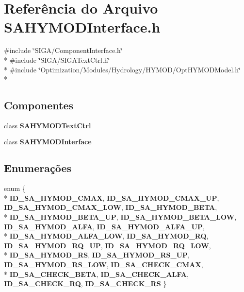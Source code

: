 \section{Referência do Arquivo S\+A\+H\+Y\+M\+O\+D\+Interface.\+h}
\label{_s_a_h_y_m_o_d_interface_8h}
{\ttfamily \#include \char`\"{}S\+I\+G\+A/\+Component\+Interface.\+h\char`\"{}}\\*
{\ttfamily \#include \char`\"{}S\+I\+G\+A/\+S\+I\+G\+A\+Text\+Ctrl.\+h\char`\"{}}\\*
{\ttfamily \#include \char`\"{}Optimization/\+Modules/\+Hydrology/\+H\+Y\+M\+O\+D/\+Opt\+H\+Y\+M\+O\+D\+Model.\+h\char`\"{}}\\*
\subsection*{Componentes}
\begin{DoxyCompactItemize}
\item 
class {\bf S\+A\+H\+Y\+M\+O\+D\+Text\+Ctrl}
\item 
class {\bf S\+A\+H\+Y\+M\+O\+D\+Interface}
\end{DoxyCompactItemize}
\subsection*{Enumerações}
\begin{DoxyCompactItemize}
\item 
enum \{ \\*
{\bf I\+D\+\_\+\+S\+A\+\_\+\+H\+Y\+M\+O\+D\+\_\+\+C\+M\+AX}, 
{\bf I\+D\+\_\+\+S\+A\+\_\+\+H\+Y\+M\+O\+D\+\_\+\+C\+M\+A\+X\+\_\+\+UP}, 
{\bf I\+D\+\_\+\+S\+A\+\_\+\+H\+Y\+M\+O\+D\+\_\+\+C\+M\+A\+X\+\_\+\+L\+OW}, 
{\bf I\+D\+\_\+\+S\+A\+\_\+\+H\+Y\+M\+O\+D\+\_\+\+B\+E\+TA}, 
\\*
{\bf I\+D\+\_\+\+S\+A\+\_\+\+H\+Y\+M\+O\+D\+\_\+\+B\+E\+T\+A\+\_\+\+UP}, 
{\bf I\+D\+\_\+\+S\+A\+\_\+\+H\+Y\+M\+O\+D\+\_\+\+B\+E\+T\+A\+\_\+\+L\+OW}, 
{\bf I\+D\+\_\+\+S\+A\+\_\+\+H\+Y\+M\+O\+D\+\_\+\+A\+L\+FA}, 
{\bf I\+D\+\_\+\+S\+A\+\_\+\+H\+Y\+M\+O\+D\+\_\+\+A\+L\+F\+A\+\_\+\+UP}, 
\\*
{\bf I\+D\+\_\+\+S\+A\+\_\+\+H\+Y\+M\+O\+D\+\_\+\+A\+L\+F\+A\+\_\+\+L\+OW}, 
{\bf I\+D\+\_\+\+S\+A\+\_\+\+H\+Y\+M\+O\+D\+\_\+\+RQ}, 
{\bf I\+D\+\_\+\+S\+A\+\_\+\+H\+Y\+M\+O\+D\+\_\+\+R\+Q\+\_\+\+UP}, 
{\bf I\+D\+\_\+\+S\+A\+\_\+\+H\+Y\+M\+O\+D\+\_\+\+R\+Q\+\_\+\+L\+OW}, 
\\*
{\bf I\+D\+\_\+\+S\+A\+\_\+\+H\+Y\+M\+O\+D\+\_\+\+RS}, 
{\bf I\+D\+\_\+\+S\+A\+\_\+\+H\+Y\+M\+O\+D\+\_\+\+R\+S\+\_\+\+UP}, 
{\bf I\+D\+\_\+\+S\+A\+\_\+\+H\+Y\+M\+O\+D\+\_\+\+R\+S\+\_\+\+L\+OW}, 
{\bf I\+D\+\_\+\+S\+A\+\_\+\+C\+H\+E\+C\+K\+\_\+\+C\+M\+AX}, 
\\*
{\bf I\+D\+\_\+\+S\+A\+\_\+\+C\+H\+E\+C\+K\+\_\+\+B\+E\+TA}, 
{\bf I\+D\+\_\+\+S\+A\+\_\+\+C\+H\+E\+C\+K\+\_\+\+A\+L\+FA}, 
{\bf I\+D\+\_\+\+S\+A\+\_\+\+C\+H\+E\+C\+K\+\_\+\+RQ}, 
{\bf I\+D\+\_\+\+S\+A\+\_\+\+C\+H\+E\+C\+K\+\_\+\+RS}
 \}
\end{DoxyCompactItemize}
